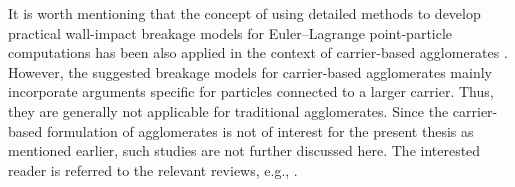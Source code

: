 It is worth mentioning that the concept of using detailed methods to
develop practical wall-impact breakage models for Euler--Lagrange
point-particle computations has been also applied in the context of
carrier-based agglomerates
\citep[e.g.,][]{vanwachem2017simulation,ariane2018wall}.  However, the
suggested breakage models for carrier-based agglomerates mainly
incorporate arguments specific for particles connected to a larger
carrier.  Thus, they are generally not applicable for traditional
agglomerates. Since the carrier-based formulation of agglomerates is
not of interest for the present thesis as mentioned earlier, such
studies are not further discussed here. The interested reader is
referred to the relevant reviews, e.g.,
\citet{zheng2021flow,yang2015numerical,sommerfeld2019potential}.
\newline


